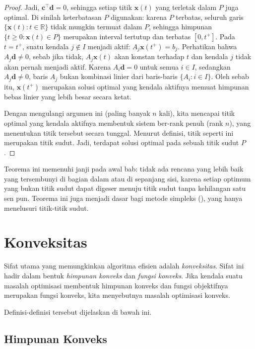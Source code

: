 \begin{proof}
Jadi, \( \mathbf{c}^\top \mathbf{d} = 0 \), sehingga setiap titik \( \mathbf{x}(t) \) yang terletak dalam \( P \) juga optimal. Di sinilah keterbatasan \( P \) digunakan: karena \( P \) terbatas, seluruh garis \( \{ \mathbf{x}(t) : t \in \mathbb{R} \} \) tidak mungkin termuat dalam \( P \), sehingga himpunan \( \{ t \geq 0 : \mathbf{x}(t) \in P \} \) merupakan interval tertutup dan terbatas \( [0, t^+] \). Pada \( t = t^+ \), suatu kendala \( j \notin I \) menjadi aktif: \( A_j \mathbf{x}(t^+) = b_j \). Perhatikan bahwa \( A_j \mathbf{d} \neq 0 \), sebab jika tidak, \( A_j \mathbf{x}(t) \) akan konstan terhadap \( t \) dan kendala \( j \) tidak akan pernah menjadi aktif. Karena \( A_i \mathbf{d} = 0 \) untuk semua \( i \in I \), sedangkan \( A_j \mathbf{d} \neq 0 \), baris \( A_j \) bukan kombinasi linier dari baris-baris \( \{ A_i : i \in I \} \). Oleh sebab itu, \( \mathbf{x}(t^+) \) merupakan solusi optimal yang kendala aktifnya memuat himpunan bebas linier yang lebih besar secara ketat.

Dengan mengulangi argumen ini (paling banyak \( n \) kali), kita mencapai titik optimal yang kendala aktifnya membentuk sistem ber-rank penuh (rank \( n \)), yang menentukan titik tersebut secara tunggal. Menurut definisi, titik seperti ini merupakan titik sudut. Jadi, terdapat solusi optimal pada sebuah titik sudut \( P \).
\end{proof}

Teorema ini memenuhi janji pada awal bab: tidak ada rencana yang lebih baik yang tersembunyi di bagian dalam atau di sepanjang sisi, karena setiap optimum yang bukan titik sudut dapat digeser menuju titik sudut tanpa kehilangan satu sen pun. Teorema ini juga menjadi dasar bagi metode simpleks (\OOSimplexChapterReference), yang hanya menelusuri titik-titik sudut.

\section{Konveksitas}\label{sec:convexity}
Sifat utama yang memungkinkan algoritma efisien adalah \emph{konveksitas}. Sifat ini hadir dalam bentuk \emph{himpunan konveks} dan \emph{fungsi konveks}. Jika kendala suatu masalah optimisasi membentuk himpunan konveks dan fungsi objektifnya merupakan fungsi konveks, kita menyebutnya masalah optimisasi konveks.

Definisi-definisi tersebut dijelaskan di bawah ini.
\subsection{Himpunan Konveks}

